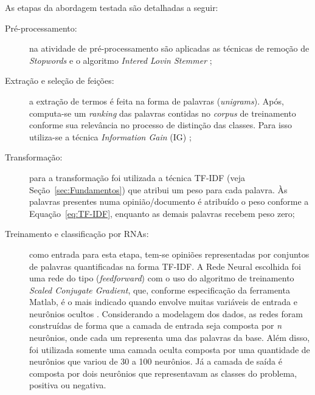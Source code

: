 \documentclass[11pt,a4paper]{article}
\begin{document}
As etapas da abordagem testada são detalhadas a seguir:
\begin{description}
  \item[Pré-processamento:] na atividade de pré-processamento são aplicadas as técnicas de remoção de \textit{Stopwords} e o algoritmo \textit{Intered Lovin Stemmer} \cite{Lovins:Development};
  \item[Extração e seleção de feições:] a extração de termos é feita na forma de palavras (\textit{unigrams}). Após, computa-se um \textit{ranking} das palavras contidas no \textit{corpus} de treinamento conforme sua relevância no processo de distinção das classes. Para isso utiliza-se a técnica \textit{Information Gain} (IG) \cite{Sebastiani:TextCateg};
  \item[Transformação:] para a transformação foi utilizada a técnica TF-IDF (veja Seção~\ref{sec:Fundamentos}) que atribui um peso para cada palavra. Às palavras presentes numa opinião/documento é atribuído o peso conforme a Equação~\ref{eq:TF-IDF}, enquanto as demais palavras recebem peso zero;
  \item[Treinamento e classificação por RNAs:] como entrada para esta etapa, tem-se opiniões representadas por conjuntos de palavras quantificadas na forma TF-IDF. A Rede Neural escolhida foi uma rede do tipo (\textit{feedforward}) com o uso do algoritmo de treinamento \textit{Scaled Conjugate Gradient}, que, conforme especificação da ferramenta Matlab, é o mais indicado quando envolve muitas variáveis de entrada e neurônios ocultos \cite{Beale:matlab}. Considerando a modelagem dos dados, as redes foram construídas de forma que a camada de entrada seja composta por \textit{n} neurônios, onde cada um representa uma das palavras da base. Além disso, foi utilizada somente uma camada oculta composta por uma quantidade de neurônios que variou de 30 a 100 neurônios. Já a camada de saída é composta por dois neurônios que representavam as classes do problema, positiva ou negativa.
\end{description}

%
\end{document}
